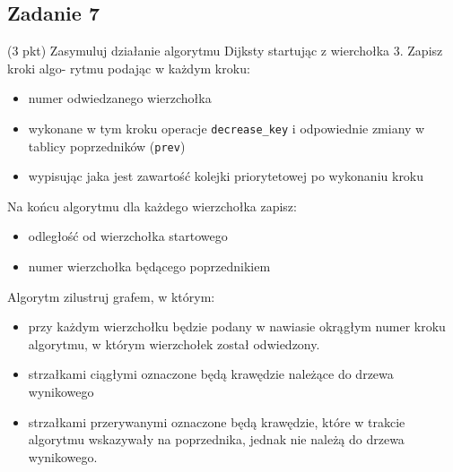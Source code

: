 \documentclass{article}
\begin{document}
\subsection*{Zadanie 7}
(3 pkt) Zasymuluj działanie algorytmu Dijksty startując z wierchołka 3. Zapisz kroki algo-
rytmu podając w każdym kroku:
\begin{itemize}
    \item numer odwiedzanego wierzchołka
    \item wykonane w tym kroku operacje \verb|decrease_key| i odpowiednie zmiany w tablicy poprzedników (\verb|prev|)
    \item wypisując jaka jest zawartość kolejki priorytetowej po wykonaniu kroku
\end{itemize}
Na końcu algorytmu dla każdego wierzchołka zapisz:
\begin{itemize}
    \item odległość od wierzchołka startowego
    \item numer wierzchołka będącego poprzednikiem
\end{itemize}
Algorytm zilustruj grafem, w którym:
\begin{itemize}
    \item przy każdym wierzchołku będzie podany w nawiasie okrągłym numer kroku algorytmu,
          w którym wierzchołek został odwiedzony.
    \item strzałkami ciągłymi oznaczone będą krawędzie należące do drzewa wynikowego
    \item strzałkami przerywanymi oznaczone będą krawędzie, które w trakcie algorytmu wskazywały
          na poprzednika, jednak nie należą do drzewa wynikowego.
\end{itemize}
\end{document}
